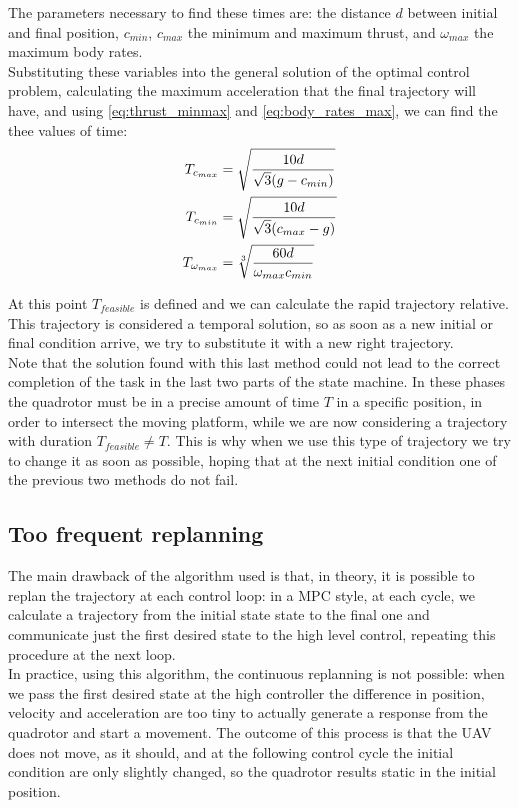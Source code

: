 The parameters necessary to find these times are: the distance $d$ between initial and final position, $c_{min}$, $c_{max}$ the minimum and maximum thrust, and $\omega_{max}$ the maximum body rates.\\ 
Substituting these variables into the general solution of the optimal control problem, calculating the maximum acceleration that the final trajectory will have, and using \ref{eq:thrust_minmax} and \ref{eq:body_rates_max}, we can find the thee values of time:
\begin{align}
\begin{split}
T_{c_{max}} &= \sqrt{\dfrac{10d}{\sqrt{3}(g-c_{min})}} \\
T_{c_{min}} &= \sqrt{\frac{\displaystyle 10d}{\displaystyle \sqrt{3}(c_{max}-g)}} \\
T_{\omega_{max}} &= \sqrt[3]{\frac{\displaystyle 60d}{\displaystyle \omega_{max}c_{min}}}
\end{split}
\end{align}

At this point $T_{feasible}$ is defined and we can calculate the rapid trajectory relative. \\ 

This trajectory is considered a temporal solution, so as soon as a new initial or final condition arrive, we try to substitute it with a new right trajectory. \\

Note that the solution found with this last method could not lead to the correct completion of the task in the last two parts of the state machine. In these phases the quadrotor must be in a precise amount of time $T$ in a specific position, in order to intersect the moving platform, while we are now considering a trajectory with duration $ T_{feasible} \neq T$. This is why when we use this type of trajectory we try to change it as soon as possible, hoping that at the next initial condition one of the previous two methods do not fail.\\


\subsection{Too frequent replanning}
The main drawback of the algorithm used is that, in theory, it is possible to replan the trajectory at each control loop: in a MPC style, at each cycle, we calculate a trajectory from the initial state state to the final one and communicate just the first desired state to the high level control, repeating this procedure at the next loop.\\
In practice, using this algorithm, the continuous replanning is not possible: when we pass the first desired state at the high controller the difference in position, velocity and acceleration are too tiny to actually generate a response from the quadrotor and start a movement. The outcome of this process is that the UAV does not move, as it should, and at the following control cycle the initial condition are only slightly changed, so the quadrotor results static in the initial position.\\

